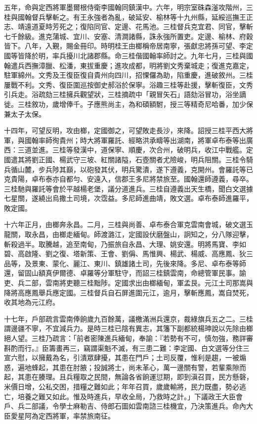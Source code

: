 \begin{pinyinscope}
五年，命與定西將軍墨爾根侍衛李國翰同鎮漢中。六年，明宗室硃森滏攻階州，三桂與國翰督兵擊斬之。有王永強者為亂，破延安、榆林等十九州縣，延綏巡撫王正志、靖遠道夏時芳死之；復陷同官、定邊、花馬池。三桂督兵克宜君、同官，擊斬七千餘級。進克蒲城、宜川、安塞、清澗諸縣，誅永強所置吏。定邊、榆林、府穀皆下。八年，入覲，賜金冊印。時明桂王由榔稱帝居南寧，張獻忠將孫可望、李定國等皆降於明，率兵擾川北諸郡縣。命三桂偕國翰率師討之。九年七月，三桂與國翰遣兵西撫漳臘、松潘，東拔重慶；進攻成都，明將劉文秀棄城走；復進克嘉定，駐軍綿州。文秀及王復臣復自貴州向四川，招惈儸為助，陷重慶，進破敘州。三桂屢戰不利。文秀、復臣圍巡按御史郝浴於保寧。浴趣三桂等赴援，擊斬復臣，文秀引兵走。浴疏劾三桂擁兵觀望狀，三桂摘疏中「親冒矢石」語劾浴冒功，浴坐謫徙。三桂敘功，歲增俸千。子應熊尚主，為和碩額駙，授三等精奇尼哈番，加少保兼太子太保。

十四年，可望反明，攻由榔，定國御之，可望敗走長沙，來降。詔授三桂平西大將軍，與國翰率師徇貴州；時大將軍羅託、經略洪承疇等出湖南，將軍卓布泰等出廣西：三道並進。三桂等發漢中，道保寧、順慶，次合州，破明兵，收江中戰艦。定國遣其將劉正國、楊武守三坡、紅關諸隘，石壺關者尤險峻，明兵阻關。三桂令騎兵循山麓，步兵陟其巔，以砲發其伏，明兵驚潰，遂下遵義，克開州。會羅託等已克貴陽，卓布泰亦自都勻、安遠入，信郡王多尼將禁旅至。國翰還師遵義，尋卒。三桂馳與羅託等會於平越楊老堡，議分道進兵。三桂自遵義出天生橋，聞白文選據七星關，遂繞出烏撒土司境，次霑益。多尼師進曲靖，敗文選。卓布泰師進羅平，敗定國。

十六年正月，由榔奔永昌。二月，三桂與尚善、卓布泰合軍克雲南會城，破文選玉龍關，取永昌，由榔走緬甸。師渡潞江，定國設伏磨盤山，詗知之，分八隊迎擊，斬殺過半。取騰越，追至南甸，乃振旅自永昌、大理、姚安還。明將馬寶、李如碧、高啟隆、劉之復、塔新策、王會、劉偁、馬惟興、楊武、楊威、高應鳳、狄三品等，及景東、蒙化、麗江、東川、鎮雄諸土司，先後來降。多尼、卓布泰等師還，留固山額真伊爾德、卓羅等分軍駐守，而詔三桂鎮雲南，命總管軍民事。諭吏、兵二部，雲南將吏聽三桂黜陟。定國求出由榔緬甸，軍孟艮。元江土司那嵩與降將高應鳳舉兵應定國。三桂督兵自石屏進圍元江，逾月，擊斬應鳳，嵩自焚死，收其地為元江府。

十七年，戶部疏言雲南俸餉歲九百餘萬，議檄滿洲兵還京，裁綠旗兵五之二。三桂謂邊疆不寧，不宜減兵力。是時三桂已陰有異志，其籓下副都統楊珅說以先除由榔絕人望。三桂乃疏言：「前者密陳進兵緬甸，奉諭：『若勢有不可，慎勿強，務詳審斟酌而行。』臣籌畫再三，竊謂渠魁不滅，有三患二難：李定國、白文選等分住三宣六慰，以擁戴為名，引潰眾肆擾，其患在門戶；土司反覆，惟利是趨，一被煽惑，遍地蜂起，其患在肘腋；投誠將士，尚未革心，萬一邊關有警，若輩乘隙而起，其患在腠理。且兵糧取之民間，無論各省餉運愆期，即到滇召買，民方懸磬，米價日增，公私交困，措糧之難如此；年年召買，歲歲輸將，民力既盡，勢必逃亡，培養之難又如此。惟及時進兵，早收全局，乃救時之計。」下議政王大臣會戶、兵二部議，令學士麻勒吉、侍郎石圖如雲南諮三桂機宜，乃決策進兵。命內大臣愛星阿為定西將軍，率禁旅南征。


\end{pinyinscope}
